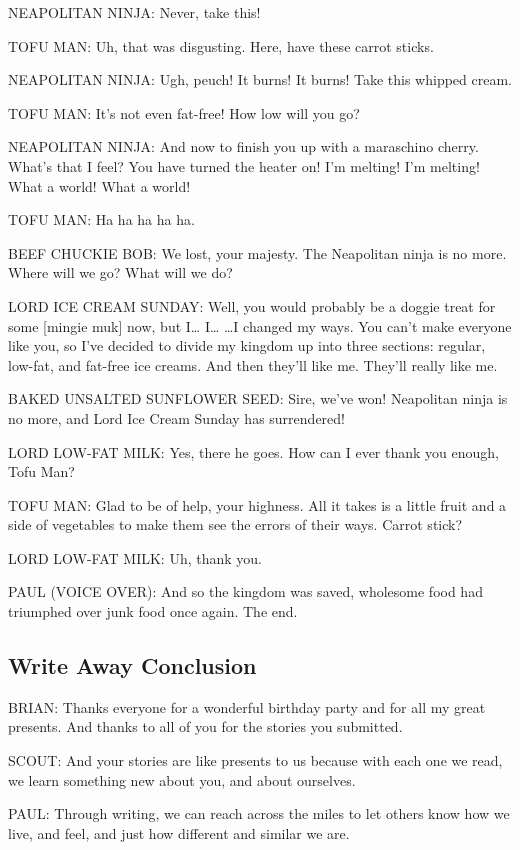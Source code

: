 NEAPOLITAN NINJA:
Never, take this!

TOFU MAN:
Uh, that was disgusting.
Here, have these carrot sticks.

NEAPOLITAN NINJA:
Ugh, peuch!
It burns! It burns!
Take this whipped cream.

TOFU MAN:
It's not even fat-free!
How low will you go?

NEAPOLITAN NINJA:
And now to finish you up with a maraschino cherry.
What's that I feel?
You have turned the heater on!
I'm melting!
I'm melting!
What a world!
What a world!

TOFU MAN:
Ha ha ha ha ha.

BEEF CHUCKIE BOB:
We lost, your majesty.
The Neapolitan ninja is no more.
Where will we go?
What will we do?

LORD ICE CREAM SUNDAY:
Well, you would probably be a doggie treat for some [mingie muk] now, but I\dots
I\dots
\dots I changed my ways.
You can't make everyone like you, so I've decided to divide my kingdom up into three sections: regular, low-fat, and fat-free ice creams.
And then they'll like me.
They'll really like me.

BAKED UNSALTED SUNFLOWER SEED:
Sire, we've won!
Neapolitan ninja is no more, and Lord Ice Cream Sunday has surrendered!

LORD LOW-FAT MILK:
Yes, there he goes.
How can I ever thank you enough, Tofu Man?

TOFU MAN:
Glad to be of help, your highness.
All it takes is a little fruit and a side of vegetables to make them see the errors of their ways.
Carrot stick?

LORD LOW-FAT MILK:
Uh, thank you.

PAUL (VOICE OVER):
And so the kingdom was saved, wholesome food had triumphed over junk food once again.
The end.

\subsection{Write Away Conclusion}

BRIAN:
Thanks everyone for a wonderful birthday party and for all my great presents.
And thanks to all of you for the stories you submitted.

SCOUT:
And your stories are like presents to us because with each one we read, we learn something new about you, and about ourselves.

PAUL:
Through writing, we can reach across the miles to let others know how we live, and feel, and just how different and similar we are.

